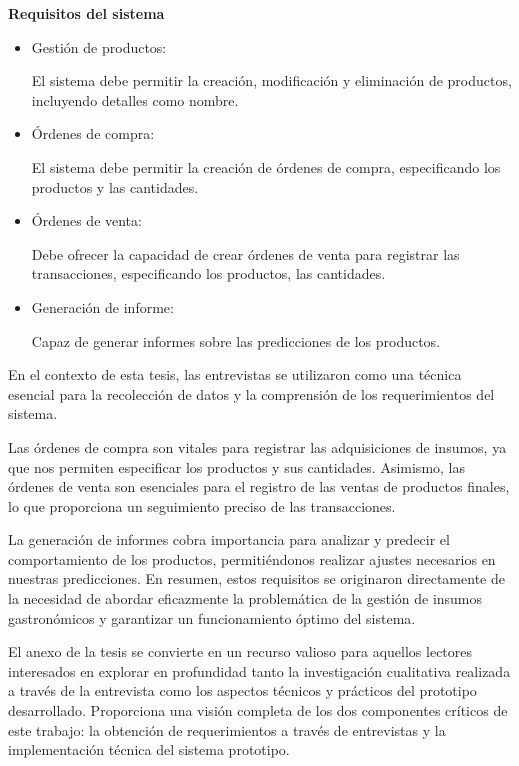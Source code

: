 \vspace{1\baselineskip}
\textbf{Requisitos del sistema}
 \begin{itemize}

  \item Gestión de productos: 
  
  El sistema debe permitir la creación, modificación y eliminación de productos, incluyendo detalles como nombre.

  \item Órdenes de compra: 
  
  El sistema debe permitir la creación de órdenes de compra, especificando los productos y las cantidades.

  \item Órdenes de venta:
  
  Debe ofrecer la capacidad de crear órdenes de venta para registrar las transacciones, especificando los productos, las cantidades.
  
  \item Generación de informe: 
  
  Capaz de generar informes sobre las predicciones de los productos.
  
 \end{itemize}

 En el contexto de esta tesis, las entrevistas se utilizaron como una técnica esencial para la recolección de datos y la comprensión de los requerimientos del sistema.

 \vspace{1\baselineskip}
 Las órdenes de compra son vitales para registrar las adquisiciones de insumos, ya que nos permiten especificar los productos y sus cantidades. Asimismo, las órdenes de venta son esenciales para el registro de las ventas de productos finales, lo que proporciona un seguimiento preciso de las transacciones.

 \vspace{1\baselineskip}
La generación de informes cobra importancia para analizar y predecir el comportamiento de los productos, permitiéndonos realizar ajustes necesarios en nuestras predicciones. En resumen, estos requisitos se originaron directamente de la necesidad de abordar eficazmente la problemática de la gestión de insumos gastronómicos y garantizar un funcionamiento óptimo del sistema.
 
\vspace{1\baselineskip}
 El anexo de la tesis se convierte en un recurso valioso para aquellos lectores interesados en explorar en profundidad tanto la investigación cualitativa realizada a través de la entrevista como los aspectos técnicos y prácticos del prototipo desarrollado. Proporciona una visión completa de los dos componentes críticos de este trabajo: la obtención de requerimientos a través de entrevistas y la implementación técnica del sistema prototipo.

